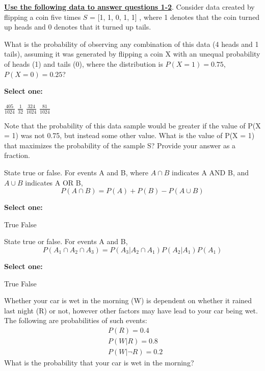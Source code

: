 \documentclass[11pt,addpoints,answers]{exam}
\numberwithin{equation}{section} %
\numberwithin{figure}{section} %
\numberwithin{table}{section} %
\begin{document}
\textbf{\underline{Use the following data to answer questions 1-2}}. Consider data created by flipping a coin five times $S $ = [1, 1, 0, 1, 1] , where 1 denotes that the coin turned up heads and 0 denotes that it turned up tails. \bigskip

\begin{questions}
    \question[1] What is the probability of observing any combination of this data (4 heads and 1 tails), assuming it was generated by flipping a coin X with an unequal probability of heads (1) and tails (0), where the distribution is $P(X = 1) = 0.75$, $P(X = 0) = 0.25$?

    \textbf{Select one:}
    \begin{checkboxes}
        \choice $\frac{405}{1024}$
        \choice $\frac{1}{32}$
        \choice $\frac{324}{1024}$
        \choice $\frac{81}{1024}$
    \end{checkboxes}


    \question[1] Note that the probability of this data sample would be greater if the value of P(X = 1) was not 0.75, but instead some other value. What is the value of P(X = 1) that maximizes the probability of the sample S? Provide your answer as a fraction.
    
    \begin{tcolorbox}[fit,height=1cm, width=2cm, blank, borderline={1pt}{-2pt},nobeforeafter]
    \end{tcolorbox}


    \question[1] State true or false. For events A and B, where $A \cap B$ indicates A AND B, and $A \cup B$ indicates A OR B,  $$ P(A \cap B) = P(A) + P(B) - P(A \cup B)$$

    \textbf{Select one:}
    \begin{checkboxes}
        \choice True
        \choice False
    \end{checkboxes}


    \question[1] State true or false. For events A and B, $$P(A_1\cap A_2 \cap A_3) = P(A_3|A_2\cap A_1)P(A_2|A_1)P(A_1)$$

    \textbf{Select one:}
    \begin{checkboxes}
        \choice True
        \choice False
    \end{checkboxes}

    
    
\clearpage
    \question[2] Whether your car is wet in the morning (W) is dependent on whether it rained last night (R) or not, however other factors may have lead to your car being wet. The following are probabilities of such events:
    \begin{eqnarray*}
        & P(R) = 0.4\\
        & P(W | R) = 0.8\\
        & P(W | \neg R ) = 0.2
    \end{eqnarray*} What is the probability that your car is wet in the morning?


\end{questions}
\end{document}
